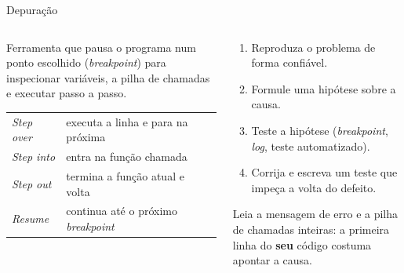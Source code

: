 \begin{frame}{Depuração}
  \begin{columns}[T]
    \begin{column}{0.5\textwidth}
      \begin{definicao}[Depurador]
        Ferramenta que pausa o programa num ponto escolhido (\emph{breakpoint}) para inspecionar variáveis, a pilha de chamadas e executar passo a passo.
      \end{definicao}
      \scriptsize
      \begin{tabularx}{\linewidth}{@{}l L@{}}
        \toprule
         &  \\
        \midrule
        \emph{Step over} & executa a linha e para na próxima \\
        \emph{Step into} & entra na função chamada \\
        \emph{Step out} & termina a função atual e volta \\
        \emph{Resume} & continua até o próximo \emph{breakpoint} \\
        \bottomrule
      \end{tabularx}
    \end{column}
    \begin{column}{0.48\textwidth}
      \begin{conceito}
        \begin{enumerate}
          \item Reproduza o problema de forma confiável.
          \item Formule uma hipótese sobre a causa.
          \item Teste a hipótese (\emph{breakpoint}, \emph{log}, teste automatizado).
          \item Corrija e escreva um teste que impeça a volta do defeito.
        \end{enumerate}
      \end{conceito}
      \begin{dica}
        Leia a mensagem de erro e a pilha de chamadas inteiras: a primeira linha do \textbf{seu} código costuma apontar a causa.
      \end{dica}
    \end{column}
  \end{columns}
\end{frame}
